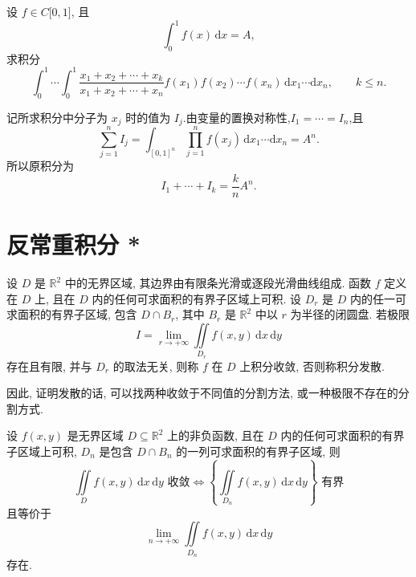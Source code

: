 \begin{example}
    设 $f\in C\lbrack0,1\rbrack$, 且
    \[
        \displaystyle\int_0^1f(x)\,\mathrm{d}x=A,
    \]
    求积分
    \[
        \displaystyle\int_0^1\cdots\int_0^1
        \dfrac{x_1+x_2+\cdots+x_k}{x_1+x_2+\cdots+x_n}
        f(x_1)f(x_2)\cdots f(x_n)
        \,\mathrm{d}x_1\cdots\mathrm{d}x_n,
        \qquad k\leq n.
    \]
\end{example}
\exampleblank

\begin{solution}
    记所求积分中分子为 $x_j$ 时的值为 $I_j$.由变量的置换对称性,$I_1=\cdots=I_n$,且
    \[
        \displaystyle\sum_{j=1}^nI_j=\int_{[0,1]^n}\prod_{j=1}^nf(x_j)\,\mathrm{d}x_1\cdots\mathrm{d}x_n=A^n.
    \]
    所以原积分为
    \[
        I_1+\cdots+I_k=\dfrac{k}{n}A^n.
    \]
\end{solution}


\newpage

\section{反常重积分 *}

\begin{definition}[无界区域]
    设 $D$ 是 $\mathbb{R}^2$ 中的无界区域, 其边界由有限条光滑或逐段光滑曲线组成. 函数 $f$ 定义在 $D$ 上, 且在 $D$ 内的任何可求面积的有界子区域上可积. 设 $D_r$ 是 $D$ 内的任一可求面积的有界子区域, 包含 $D\cap B_r$, 其中 $B_r$ 是 $\mathbb{R}^2$ 中以 $r$ 为半径的闭圆盘. 若极限
    \[
        I=\lim\limits_{r\to+\infty}\iint\limits_{D_r}f(x,y)\,\mathrm{d}x\,\mathrm{d}y
    \]
    存在且有限, 并与 $D_r$ 的取法无关, 则称 $f$ 在 $D$ 上积分收敛, 否则称积分发散.
\end{definition}

\begin{remark}
    因此, 证明发散的话, 可以找两种收敛于不同值的分割方法, 或一种极限不存在的分割方式.
\end{remark}

\begin{theorem}[\markstar]
    设 $f(x,y)$ 是无界区域 $D\subseteq\mathbb{R}^2$ 上的非负函数, 且在 $D$ 内的任何可求面积的有界子区域上可积, $D_n$ 是包含 $D\cap B_n$ 的一列可求面积的有界子区域, 则
    \[
        \displaystyle\iint\limits_D f(x,y)\,\mathrm{d}x\,\mathrm{d}y\text{ 收敛}
        \iff
        \left\{\iint\limits_{D_n}f(x,y)\,\mathrm{d}x\,\mathrm{d}y\right\}\text{ 有界}
    \]
    且等价于
    \[
        \displaystyle\lim\limits_{n\to+\infty}\iint\limits_{D_n}f(x,y)\,\mathrm{d}x\,\mathrm{d}y
    \]
    存在.
\end{theorem}

